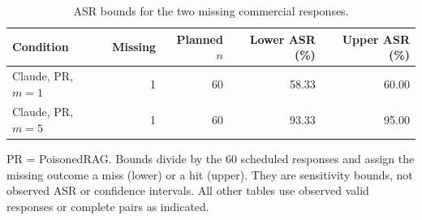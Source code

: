 \begin{table}[!htbp]
\centering
\caption{ASR bounds for the two missing commercial responses.}
\label{tab:commercial_bounds}
\begingroup\fontsize{9}{10.8}\selectfont
\setlength{\tabcolsep}{4.0pt}
\renewcommand{\arraystretch}{1.13}
\begin{tabular}{@{}lrrrr@{}}
\toprule
Condition & Missing & Planned $n$ & Lower ASR (\%) & Upper ASR (\%) \\
\midrule
Claude, PR, $m=1$ & 1 & 60 & 58.33 & 60.00 \\
Claude, PR, $m=5$ & 1 & 60 & 93.33 & 95.00 \\
\bottomrule
\end{tabular}
\endgroup
\par\vspace{4pt}\begin{minipage}{\linewidth}\footnotesize PR = PoisonedRAG. Bounds divide by the 60 scheduled responses and assign the missing outcome a miss (lower) or a hit (upper). They are sensitivity bounds, not observed ASR or confidence intervals. All other tables use observed valid responses or complete pairs as indicated.\end{minipage}
\end{table}
